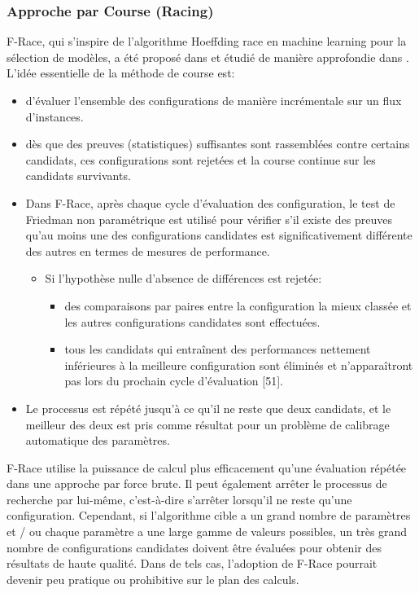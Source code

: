 \documentclass[12pt]{article}
\begin{document}
        \subsubsection{Approche par Course (Racing)}
            F-Race, qui s'inspire de l'algorithme Hoeffding race \cite{maron1994hoeffding, maron1997racing}  en machine learning pour la sélection de modèles, a été proposé dans \cite{birattari2002racing} et étudié de manière approfondie dans \cite{birattari2009tuning}. L'idée essentielle de la méthode de course est:
            \begin{itemize}
                \item d'évaluer l’ensemble des configurations de manière incrémentale sur un flux d'instances. 
                \item dès que des preuves (statistiques) suffisantes sont rassemblées contre certains candidats, ces configurations sont rejetées et la course continue sur les candidats survivants. 
                \item Dans F-Race, après chaque cycle d'évaluation des configuration, le test de Friedman non paramétrique est utilisé pour vérifier s'il existe des preuves qu'au moins une des configurations candidates est significativement différente des autres en termes de mesures de performance. 
                    \begin{itemize}
                        \item Si l'hypothèse nulle d'absence de différences est rejetée:
                            \begin{itemize}
                                \item des comparaisons par paires entre la configuration la mieux classée et les autres configurations candidates sont effectuées.
                                \item tous les candidats qui entraînent des performances nettement inférieures à la meilleure configuration sont éliminés et n'apparaîtront pas lors du prochain cycle d'évaluation [51].
                            \end{itemize}
                    \end{itemize}
                \item Le processus est répété jusqu'à ce qu'il ne reste que deux candidats, et le meilleur des deux est pris comme résultat pour un problème de calibrage automatique des paramètres.                
            \end{itemize}
            F-Race utilise la puissance de calcul plus efficacement qu'une évaluation répétée dans une approche par force brute. Il peut également arrêter le processus de recherche par lui-même, c'est-à-dire s'arrêter lorsqu'il ne reste qu'une configuration. Cependant, si l'algorithme cible a un grand nombre de paramètres et / ou chaque paramètre a une large gamme de valeurs possibles, un très grand nombre de configurations candidates doivent être évaluées pour obtenir des résultats de haute qualité. Dans de tels cas, l'adoption de F-Race pourrait devenir peu pratique ou prohibitive sur le plan des calculs.
\end{document}
